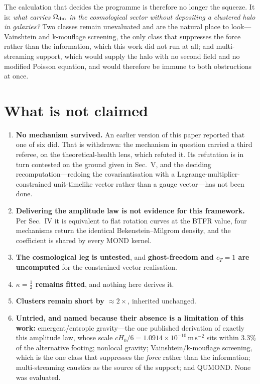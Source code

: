 \documentclass[aps,prd,twocolumn,superscriptaddress,nofootinbib,floatfix]{revtex4-2}
\begin{document}
The calculation that decides the programme is therefore no longer the squeeze. It is: \emph{what
carries $\Omega_{\rm dm}$ in the cosmological sector without depositing a clustered halo in
galaxies?} Two classes remain unevaluated and are the natural place to look---Vainshtein and
k-mouflage screening, the only class that suppresses the force rather than the information, which
this work did not run at all; and multi-streaming support, which would supply the halo with no
second field and no modified Poisson equation, and would therefore be immune to both obstructions
at once.

\section{What is not claimed}

\begin{enumerate}\itemsep2pt
\item \textbf{No mechanism survived.} An earlier version of this paper reported that one of
six did. That is withdrawn: the mechanism in question carried a third referee, on the
theoretical-health lens, which refuted it. Its refutation is in turn contested on the
ground given in Sec.~V, and the deciding recomputation---redoing the covariantisation with
a Lagrange-multiplier-constrained unit-timelike vector rather than a gauge vector---has not
been done.
\item \textbf{Delivering the amplitude law is not evidence for this framework.} Per
Sec.~IV it is equivalent to flat rotation curves at the BTFR value, four mechanisms return
the identical Bekenstein--Milgrom density, and the coefficient is shared by every MOND
kernel.
\item \textbf{The cosmological leg is untested}, and \textbf{ghost-freedom and $c_T=1$ are
uncomputed} for the constrained-vector realisation.
\item \textbf{$\kappa=\tfrac12$ remains fitted}, and nothing here derives it.
\item \textbf{Clusters remain short by ${\approx}2\times$}, inherited unchanged.
\item \textbf{Untried, and named because their absence is a limitation of this work:}
emergent/entropic gravity---the one published derivation of exactly this amplitude law,
whose scale $cH_0/6 = 1.0914\times10^{-10}\,\mathrm{m\,s^{-2}}$ sits within $3.3\%$ of the
alternative footing; nonlocal gravity; Vainshtein/k-mouflage screening, which is the one
class that suppresses the \emph{force} rather than the information; multi-streaming
caustics as the source of the support; and QUMOND. None was evaluated.
\end{enumerate}
\end{document}
